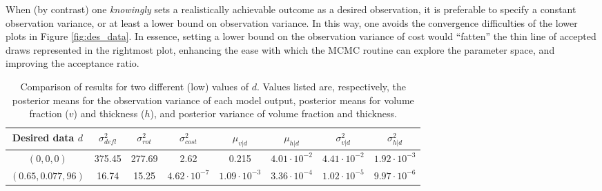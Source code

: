 \documentclass{article}
\begin{document}
When (by contrast) one \emph{knowingly} sets a realistically achievable outcome as a desired observation, it is preferable to specify a constant observation variance, or at least a lower bound on observation variance. In this way, one avoids the convergence difficulties of the lower plots in Figure \ref{fig:des_data}. In essence, setting a lower bound on the observation variance of cost would ``fatten'' the thin line of accepted draws represented in the rightmost plot, enhancing the ease with which the MCMC routine can explore the parameter space, and improving the acceptance ratio.

\begin{table}[h]
\centering
\begin{tabular}{| c | c  | c  |  c | c  | c | c | c |}
\hline
Desired data $d$ & $\sigma^2_{defl}$ & $\sigma^2_{rot}$ & $\sigma^2_{cost}$ & $\mu_{v|d}$ &
                            $\mu_{h|d}$ & $\sigma^2_{v|d}$ & $\sigma^2_{h|d}$\\
\hline
$(0, 0, 0)$ & 375.45 & 277.69 & 2.62 & 0.215 & $4.01 \cdot 10^{-2}$&
	$4.41\cdot 10^{-2}$ & $1.92 \cdot 10^{-3}$\\
$(0.65, 0.077, 96)$ & 16.74 & 15.25 & $4.62 \cdot 10^{-7}$ &
	$1.09 \cdot 10^{-3}$ & $3.36 \cdot10^{-4}$ &
	$1.02 \cdot 10^{-5}$ & $9.97 \cdot 10^{-6}$\\
\hline
\end{tabular}
\captionsetup{width=.95\linewidth}
\caption{Comparison of results for two different (low) values of $d$. Values listed are, respectively, the posterior means for the observation variance of each model output, posterior means for volume fraction ($v$) and thickness ($h$), and posterior variance of volume fraction and thickness.}
\label{table:d_comp}
\end{table}
\end{document}
